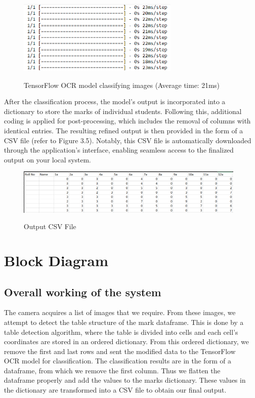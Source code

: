 \begin{figure}[htbp]
    \centering
{\includegraphics[scale=0.5, width=0.7\textwidth]{Images/results/TF_model_Running.png}}
  \caption{TensorFlow OCR model classifying images (Average time: 21ms)}
\end{figure}

\noindent After the classification process, the model's output is incorporated into a dictionary to store the marks of individual students. Following this, additional coding is applied for post-processing, which includes the removal of columns with identical entries. The resulting refined output is then provided in the form of a CSV file (refer to Figure 3.5). Notably, this CSV file is automatically downloaded through the application's interface, enabling seamless access to the finalized output on your local system.

\begin{figure}[htbp]
    \centering
{\includegraphics[width=1\textwidth]{Images/results/csv_output.png}}
  \caption{Output CSV File}
\end{figure}

\clearpage

\section{Block Diagram}

\subsection{Overall working of the system}

\noindent
The camera acquires a list of images that we require. From these images, we attempt to detect the table structure of the mark dataframe. This is done by a table detection algorithm, where the table is divided into cells and each cell's coordinates are stored in an ordered dictionary. From this ordered dictionary, we remove the first and last rows and sent the modified data to the TensorFlow OCR model for classification. The classification results are in the form of a dataframe, from which we remove the first column. Thus we flatten the dataframe properly and add the values to the marks dictionary. These values in the dictionary are transformed into a CSV file to obtain our final output.

